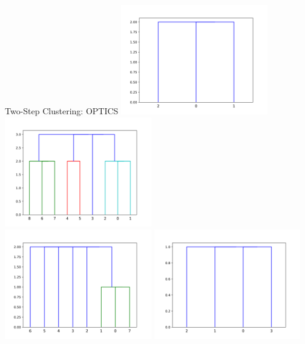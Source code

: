 \documentclass[rgb]{beamer}
\begin{document}
        \begin{frame}{Two-Step Clustering: OPTICS}
           \centering  \includegraphics[keepaspectratio,width=0.48\textwidth, height=0.48\textheight]{graphics/results_two_step/noise_0_optics_dendro.png} \hspace{2cm}
             \includegraphics[keepaspectratio,width=0.48\textwidth, height=0.48\textheight]{graphics/results_two_step/noise_10_optics_dendro.png} \\
             \includegraphics[keepaspectratio,width=0.48\textwidth, height=0.48\textheight]{graphics/results_two_step/noise_33_optics_dendro.png} \hspace{2cm}
             \includegraphics[keepaspectratio,width=0.48\textwidth, height=0.48\textheight]{graphics/results_two_step/noise_50_optics_dendro.png}
        \end{frame}{}
\end{document}
